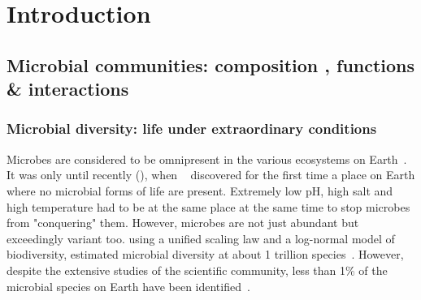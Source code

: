 \chapter{Introduction}
\label{cha:intro}



\section{Microbial communities: composition 
, functions 
\& interactions 
}
   \subsection{Microbial diversity: life under extraordinary conditions}
   \label{subsec:microbial_diversity}

      Microbes are considered to be omnipresent in the 
      various ecosystems on Earth~\citep{falkowski2008microbial}.
      It was only until recently (\citeyear{belilla2019hyperdiverse}), 
      when ~\citeauthor{belilla2019hyperdiverse} discovered for the first time 
      a place on Earth where no microbial forms of life are present.
      Extremely low pH, high salt and high temperature had to be 
      at the same place at the same time to stop microbes
      from "conquering" them.
      However, microbes are not just abundant but 
      exceedingly variant too.
      \citeauthor{locey2016scaling} using a unified scaling law
      and a log-normal model of biodiversity, 
      estimated microbial diversity at about 1 trillion species~\citep{locey2016scaling}.
      However, despite the extensive studies of the scientific community, 
      less than 1\% of the microbial species on Earth have been identified~\citep{isme}.
      
